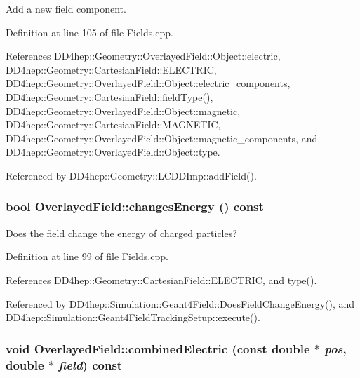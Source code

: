 Add a new field component. 

Definition at line 105 of file Fields.cpp.

References DD4hep::Geometry::OverlayedField::Object::electric, DD4hep::Geometry::CartesianField::ELECTRIC, DD4hep::Geometry::OverlayedField::Object::electric\_\-components, DD4hep::Geometry::CartesianField::fieldType(), DD4hep::Geometry::OverlayedField::Object::magnetic, DD4hep::Geometry::CartesianField::MAGNETIC, DD4hep::Geometry::OverlayedField::Object::magnetic\_\-components, and DD4hep::Geometry::OverlayedField::Object::type.

Referenced by DD4hep::Geometry::LCDDImp::addField().\hypertarget{class_d_d4hep_1_1_geometry_1_1_overlayed_field_aae467e2f06b9842ef57133cefc0a0ce0}{
\subsubsection[{changesEnergy}]{\setlength{\rightskip}{0pt plus 5cm}bool OverlayedField::changesEnergy () const}}
\label{class_d_d4hep_1_1_geometry_1_1_overlayed_field_aae467e2f06b9842ef57133cefc0a0ce0}


Does the field change the energy of charged particles? 

Definition at line 99 of file Fields.cpp.

References DD4hep::Geometry::CartesianField::ELECTRIC, and type().

Referenced by DD4hep::Simulation::Geant4Field::DoesFieldChangeEnergy(), and DD4hep::Simulation::Geant4FieldTrackingSetup::execute().\hypertarget{class_d_d4hep_1_1_geometry_1_1_overlayed_field_ab00ec3a945a635c235e9ae5d6cffcf03}{
\subsubsection[{combinedElectric}]{\setlength{\rightskip}{0pt plus 5cm}void OverlayedField::combinedElectric (const double $\ast$ {\em pos}, \/  double $\ast$ {\em field}) const}}
\label{class_d_d4hep_1_1_geometry_1_1_overlayed_field_ab00ec3a945a635c235e9ae5d6cffcf03}


